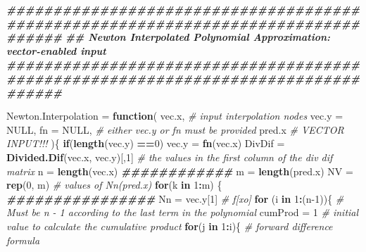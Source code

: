 \documentclass[
]{book}
\newenvironment{Shaded}{\begin{snugshade}}{\end{snugshade}}
\newcommand{\AttributeTok}[1]{\textcolor[rgb]{0.13,0.29,0.53}{#1}}
\newcommand{\CommentTok}[1]{\textcolor[rgb]{0.56,0.35,0.01}{\textit{#1}}}
\newcommand{\ConstantTok}[1]{\textcolor[rgb]{0.56,0.35,0.01}{#1}}
\newcommand{\ControlFlowTok}[1]{\textcolor[rgb]{0.13,0.29,0.53}{\textbf{#1}}}
\newcommand{\DecValTok}[1]{\textcolor[rgb]{0.00,0.00,0.81}{#1}}
\newcommand{\DocumentationTok}[1]{\textcolor[rgb]{0.56,0.35,0.01}{\textbf{\textit{#1}}}}
\newcommand{\FunctionTok}[1]{\textcolor[rgb]{0.13,0.29,0.53}{\textbf{#1}}}
\newcommand{\NormalTok}[1]{#1}
\newcommand{\OtherTok}[1]{\textcolor[rgb]{0.56,0.35,0.01}{#1}}
\newcommand{\SpecialCharTok}[1]{\textcolor[rgb]{0.81,0.36,0.00}{\textbf{#1}}}
\begin{document}
\begin{Shaded}
\begin{Highlighting}[]
\DocumentationTok{\#\#\#\#\#\#\#\#\#\#\#\#\#\#\#\#\#\#\#\#\#\#\#\#\#\#\#\#\#\#\#\#\#\#\#\#\#\#\#\#\#\#\#\#\#\#\#\#\#\#\#\#\#\#\#\#\#\#\#\#\#\#\#\#\#\#\#\#\#\#\#\#\#\#\#\#\#\#\#\#\#\#}
\DocumentationTok{\#\#  Newton Interpolated Polynomial Approximation: vector{-}enabled input}
\DocumentationTok{\#\#\#\#\#\#\#\#\#\#\#\#\#\#\#\#\#\#\#\#\#\#\#\#\#\#\#\#\#\#\#\#\#\#\#\#\#\#\#\#\#\#\#\#\#\#\#\#\#\#\#\#\#\#\#\#\#\#\#\#\#\#\#\#\#\#\#\#\#\#\#\#\#\#\#\#\#\#\#\#\#\#}

\NormalTok{Newton.Interpolation }\OtherTok{=} \ControlFlowTok{function}\NormalTok{( vec.x,            }\CommentTok{\# input interpolation nodes}
                                \AttributeTok{vec.y =} \ConstantTok{NULL}\NormalTok{,    }
                                \AttributeTok{fn =} \ConstantTok{NULL}\NormalTok{,        }\CommentTok{\# either vec.y or fn must be provided}
\NormalTok{                                pred.x            }\CommentTok{\# VECTOR INPUT!!!}
\NormalTok{                              )\{}
   \ControlFlowTok{if}\NormalTok{(}\FunctionTok{length}\NormalTok{(vec.y) }\SpecialCharTok{==}\DecValTok{0}\NormalTok{) vec.y }\OtherTok{=} \FunctionTok{fn}\NormalTok{(vec.x)}
\NormalTok{   DivDif }\OtherTok{=} \FunctionTok{Divided.Dif}\NormalTok{(vec.x, vec.y)[,}\DecValTok{1}\NormalTok{]       }\CommentTok{\# the values in the first column of the div dif matrix}
\NormalTok{   n }\OtherTok{=} \FunctionTok{length}\NormalTok{(vec.x)}
   \DocumentationTok{\#\#\#\#\#\#\#\#\#\#\#\#}
\NormalTok{   m }\OtherTok{=} \FunctionTok{length}\NormalTok{(pred.x)}
\NormalTok{   NV }\OtherTok{=} \FunctionTok{rep}\NormalTok{(}\DecValTok{0}\NormalTok{, m)                 }\CommentTok{\# values of Nn(pred.x)}
   \ControlFlowTok{for}\NormalTok{(k }\ControlFlowTok{in} \DecValTok{1}\SpecialCharTok{:}\NormalTok{m) \{}
   \DocumentationTok{\#\#\#\#\#\#\#\#\#\#\#\#\#\#\#\#}
\NormalTok{   Nn }\OtherTok{=}\NormalTok{ vec.y[}\DecValTok{1}\NormalTok{]                  }\CommentTok{\# f[xo]}
   \ControlFlowTok{for}\NormalTok{ (i }\ControlFlowTok{in} \DecValTok{1}\SpecialCharTok{:}\NormalTok{(n}\DecValTok{{-}1}\NormalTok{))\{            }\CommentTok{\# Must be n {-} 1 according to the last term in the polynomial}
\NormalTok{     cumProd }\OtherTok{=} \DecValTok{1}                  \CommentTok{\# initial value to calculate the cumulative product}
     \ControlFlowTok{for}\NormalTok{(j }\ControlFlowTok{in} \DecValTok{1}\SpecialCharTok{:}\NormalTok{i)\{               }\CommentTok{\# forward difference formula}

\end{Highlighting}
\end{Shaded}
\end{document}
